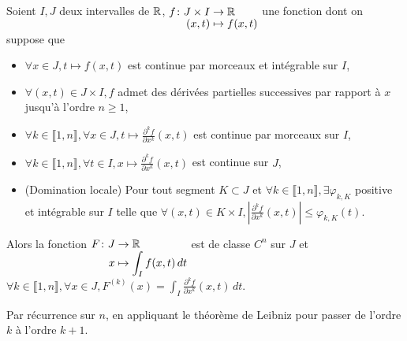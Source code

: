 \documentclass[a4paper, 12pt]{article}
\begin{document}
\begin{theoreme}{}{}
    Soient $I, J$ deux intervalles de $\mathbb{R}$, $\funcdef{f}{J \times I}{\R}{(x, t)}{f(x, t)}$ une fonction dont on suppose que
    \begin{itemize}
        \item $\forall x \in J, t \mapsto f(x, t)$ est continue par morceaux et intégrable sur $I$,
        \item $\forall (x, t) \in J \times I, f$ admet des dérivées partielles successives par rapport à $x$ jusqu'à l'ordre $n \geq 1$,
        \item $\forall k \in \llbracket 1, n \rrbracket, \forall x \in J, t \mapsto \frac{\partial^k f}{\partial x^k}(x, t)$ est continue par morceaux sur $I$,
        \item $\forall k \in \llbracket 1, n \rrbracket, \forall t \in I, x \mapsto \frac{\partial^k f}{\partial x^k}(x, t)$ est continue sur $J$,
        \item (Domination locale) Pour tout segment $K \subset J$ et $\forall k \in \llbracket 1, n \rrbracket, \exists \varphi_{k,K}$ positive et intégrable sur $I$ telle que $\forall (x, t) \in K \times I, \left| \frac{\partial^k f}{\partial x^k}(x, t) \right| \leq \varphi_{k,K}(t)$.
    \end{itemize}
    Alors la fonction $\funcdef{F}{J}{\R}{x}{\int_I f(x, t) \, dt}$ est de classe $C^n$ sur $J$ et $\forall k \in \llbracket 1, n \rrbracket, \forall x \in J, F^{(k)}(x) = \int_I \frac{\partial^k f}{\partial x^k}(x, t) \, dt$.
\end{theoreme}

\begin{demonstration}
    Par récurrence sur $n$, en appliquant le théorème de Leibniz pour passer de l'ordre $k$ à l'ordre $k+1$.
\end{demonstration}
\end{document}

